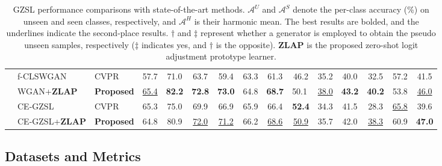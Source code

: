 \documentclass{article}
\begin{document}
\begin{table*}[t]
{\begin{tabular}{@{}cllcccccccccccc}
\noalign{\smallskip}
\cline{2-15}
\noalign{\smallskip}
  \multicolumn{1}{c|}{}             & f-CLSWGAN               & CVPR \cite{xian2018feature}             & 57.7 & 71.0 & 63.7            & 59.4          & 63.3         & 61.3         & 46.2          & 35.2          & 40.0          & 32.5             & 57.2             & 41.5             \\
	\multicolumn{1}{c|}{}			&WGAN+{\bf ZLAP}                & {\bf Proposed}                    & \underline{65.4} & {\bf82.2} & {\bf72.8}                  & \multicolumn{1}{l}{{\bf 73.0}} & 64.8                 & {\bf 68.7}                  & \multicolumn{1}{l}{50.1} & \underline{38.0}                  &{\bf 43.2}                  & \multicolumn{1}{l}{{\bf 40.2}} & 53.8                  &\underline{ 46.0}                 \\
    \noalign{\smallskip}
\cline{2-15}
\noalign{\smallskip}
    \multicolumn{1}{c|}{}            &CE-GZSL                 & CVPR \cite{han2021contrastive}     & 65.3          & 75.0         & 69.9          & 66.9    & 65.9          & 66.4          & {\bf 52.4}          & 34.3          & 41.5          & 28.3            & \underline{65.8}             &39.6             \\
     \multicolumn{1}{c|}{}           &CE-GZSL+{\bf ZLAP}    &{\bf Proposed}   &64.8 &80.9 &\underline{72.0}   &\underline{71.2} &66.2 &\underline{68.6} &\underline{50.9}&35.7&42.0   &\underline{38.3} &60.9 &{\bf47.0}\\
				\bottomrule
			\end{tabular}
		}
		\caption{GZSL performance comparisons with state-of-the-art methods. $\mathcal{A}^U$ and $\mathcal{A}^S$ denote the per-class accuracy (\%) on unseen and seen classes, respectively, and $\mathcal{A}^H$ is their harmonic mean. The best results are bolded, and the underlines indicate the second-place results. $\dagger$ and $\ddagger$ represent whether a generator is employed to obtain the pseudo unseen samples, respectively ($\ddagger$ indicates yes, and $\dagger$ is the opposite). {\bf ZLAP} is the proposed zero-shot logit adjustment prototype learner.}
        \vspace{-2ex}
		\label{tab2}
	\end{table*}
	\subsection{Datasets and Metrics}
\label{metric}
\end{document}
